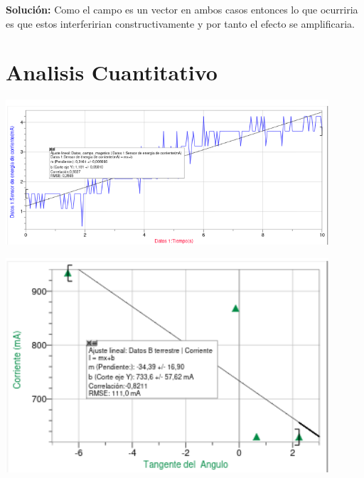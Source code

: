 \documentclass[12pt]{exam}
\newenvironment{Figura}
  {\par\medskip\noindent\minipage{\linewidth}}
  {\endminipage\par\medskip}
\begin{document}
\begin{multicols}{2}
\begin{enumerate}
\textbf{Solución: } Como el campo es un vector en ambos casos entonces lo que ocurriria es que estos interferirian
constructivamente y por tanto el efecto se amplificaria.
\end{enumerate}
\section{Analisis Cuantitativo}
\begin{Figura}
    \centering
    \includegraphics[width=0.9\textwidth]{Figura_1_Lab13.png}
    \label{fig}
\end{Figura}
\begin{Figura}
  \centering
  \includegraphics[width=0.9\textwidth]{Figura_2_Lab13.png}
\end{Figura}

\end{multicols}
\end{document}
